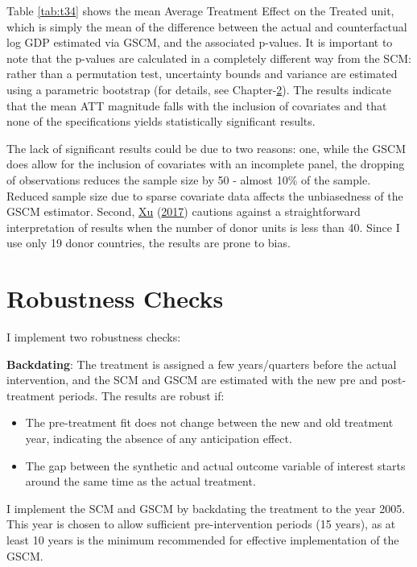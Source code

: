 \documentclass[12pt,nobind, a4paper]{reedthesis}
\begin{document}
 Table \ref{tab:t34} shows the mean Average Treatment Effect on the Treated unit, which is simply the mean of the difference between the actual and counterfactual log GDP estimated via GSCM, and the associated p-values. It is important to note that the p-values are calculated in a completely different way from the SCM: rather than a permutation test, uncertainty bounds and variance are estimated using a parametric bootstrap (for details, see Chapter-\protect\hyperlink{ch2}{2}). The results indicate that the mean ATT magnitude falls with the inclusion of covariates and that none of the specifications yields statistically significant results.
 \linebreak

 The lack of significant results could be due to two reasons: one, while the GSCM does allow for the inclusion of covariates with an incomplete panel, the dropping of observations reduces the sample size by 50 - almost 10\% of the sample. Reduced sample size due to sparse covariate data affects the unbiasedness of the GSCM estimator. Second, \protect\hyperlink{ref-xu_generalized_2017}{Xu} (\protect\hyperlink{ref-xu_generalized_2017}{2017}) cautions against a straightforward interpretation of results when the number of donor units is less than 40. Since I use only 19 donor countries, the results are prone to bias.

 \hypertarget{rob}{%
 \section{Robustness Checks}\label{rob}}

 I implement two robustness checks:

 \textbf{Backdating}: The treatment is assigned a few years/quarters before the actual intervention, and the SCM and GSCM are estimated with the new pre and post-treatment periods. The results are robust if:
 \begin{itemize}
  
  \item The pre-treatment fit does not change between the new and old treatment year, indicating the absence of any anticipation effect.

 \item The gap between the synthetic and actual outcome variable of interest starts around the same time as the actual treatment.
 \end{itemize}
 I implement the SCM and GSCM by backdating the treatment to the year 2005. This year is chosen to allow sufficient pre-intervention periods (15 years), as at least 10 years is the minimum recommended for effective implementation of the GSCM.
\end{document}
